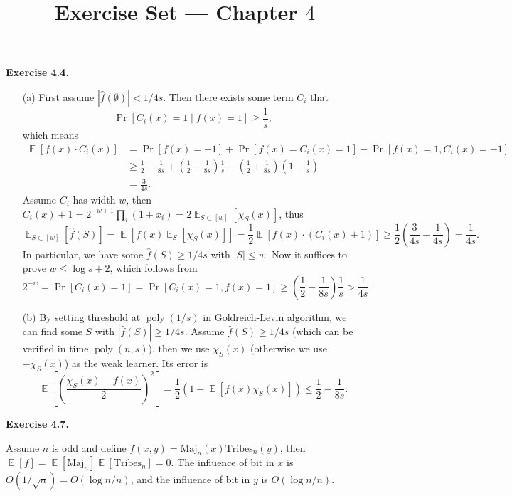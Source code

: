 \documentclass[a4paper]{article}
\title{Exercise Set --- Chapter $4$}
\date{}
\newenvironment{exercise}[1]{
	\par
	\noindent\textbf{Exercise #1.}\quad
}{
	\par
	\bigskip
}
\DeclareMathOperator{\E}{\mathbb E}
\DeclareMathOperator{\poly}{\mathrm{poly}}
\newcommand{\abs}[1]{{\left| #1 \right|}}
\newcommand{\pbra}[1]{{\left( #1 \right)}}
\newcommand{\sbra}[1]{{\left[ #1 \right]}}
\begin{document}
\maketitle

\begin{exercise}{4.4}
    \begin{itemize}
        \item[(a)] First assume $\abs{\hat f(\emptyset)}<1/4s$.
            Then there exists some term $C_i$ that
            $$
            \Pr\sbra{C_i(x)=1\mid f(x)=1}\geq\frac1s,
            $$
            which means
            \begin{align*}
                \E\sbra{f(x)\cdot C_i(x)}
                &=\Pr\sbra{f(x)=-1}+\Pr\sbra{f(x)=C_i(x)=1}-\Pr\sbra{f(x)=1,C_i(x)=-1}\\
                &\geq\frac12-\frac1{8s}+\pbra{\frac12-\frac1{8s}}\frac1s-\pbra{\frac12+\frac1{8s}}\pbra{1-\frac1s}\\
                &=\frac3{4s}.
            \end{align*}
            Assume $C_i$ has width $w$, then $C_i(x)+1=2^{-w+1}\prod_i(1+x_i)=2\E_{S\subset[w]}\sbra{\chi_S(x)}$, thus
            $$
                \E_{S\subset[w]}\sbra{\hat f(S)}
                =\E\sbra{f(x)\E_S\sbra{\chi_S(x)}}
                =\frac12\E\sbra{f(x)\cdot (C_i(x)+1)}
                \geq\frac12\pbra{\frac3{4s}-\frac1{4s}}=\frac1{4s}.
            $$
            In particular, we have some $\hat f(S)\geq1/4s$ with $|S|\leq w$. 
            Now it suffices to prove $w\leq\log s+2$, which follows from 
            $$
            2^{-w}=\Pr\sbra{C_i(x)=1}=\Pr\sbra{C_i(x)=1,f(x)=1}\geq\pbra{\frac12-\frac1{8s}}\frac1s>\frac1{4s}.
            $$
        \item[(b)]
            By setting threshold at $\poly(1/s)$ in Goldreich-Levin algorithm, we can find some $S$ with $\abs{\hat f(S)}\geq1/4s$.
            Assume $\hat f(S)\geq1/4s$ (which can be verified in time $\poly(n,s)$), then we use $\chi_S(x)$ (otherwise we use $-\chi_S(x)$) as the weak learner.
            Its error is 
            $$
            \E\sbra{\pbra{\frac{\chi_S(x)-f(x)}2}^2}=\frac12\pbra{1-\E\sbra{f(x)\chi_S(x)}}\leq\frac12-\frac1{8s}.
            $$
    \end{itemize}
\end{exercise}

\begin{exercise}{4.7}
    Assume $n$ is odd and define $f(x,y)=\text{Maj}_n(x)\text{Tribes}_n(y)$, then $\E[f]=\E[\text{Maj}_n]\E[\text{Tribes}_n]=0$.
    The influence of bit in $x$ is $O(1/\sqrt n)=O(\log n/n)$, and the influence of bit in $y$ is $O(\log n/n)$.
\end{exercise}
\end{document}
